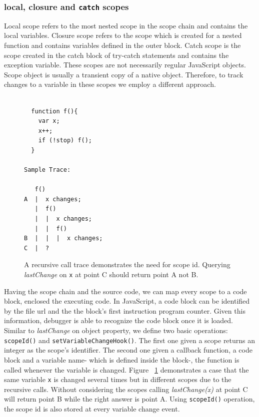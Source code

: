 \documentclass[preprint]{sigplanconf}
\begin{document}
\subsubsection{local, closure and \texttt{catch} scopes}
Local scope refers to the most nested scope in the scope
chain and contains the local variables. Closure scope refers to the 
scope which is created for a nested function and contains variables 
defined in the outer block. Catch scope is the scope created in the catch
block of try-catch statements and contains the exception
variable. These scopes are not necessarily regular JavaScript
objects. Scope object is usually a transient copy of a native object. 
Therefore, to track changes to a variable in these scopes we
employ a different approach.

\begin{figure}[htp]
\begin{verbatim}

  function f(){
    var x;
    x++;
    if (!stop) f();
  }

Sample Trace:

   f()
A  |  x changes; 
   |  f()
   |  |  x changes;
   |  |  f()
B  |  |  |  x changes; 
C  |  ?

\end{verbatim}
\caption{A recursive call trace demonstrates the need for scope
  id. Querying \textit{lastChange} on \texttt{x} at point C should
  return point A not B.}
\label{fig:recursive}
\end{figure}

Having the scope chain and the source code, we can map every scope to %
a code block, enclosed the executing code. In
JavaScript, a code block can be identified by the file url and the 
the block's first instruction program counter. Given this information, debugger is
able to recognize the code block once it is loaded.
Similar to \textit{lastChange} on object property, we define two basic operations: 
\texttt{scopeId()} and \texttt{setVariableChangeHook()}. The first one 
given a scope returns an integer as the scope's identifier. The second one 
given a callback function, a code block and a variable name-
which is defined inside the block-, the function is called
whenever the variable is changed. Figure ~\ref{fig:recursive} demonstrates a case that the same variable
\texttt{x} is changed several times but in different scopes due to the
recursive calls. Without considering the scopes calling \textit{lastChange(x)}
at point C will return point B while the right answer is point A. Using
\texttt{scopeId()} operation, the scope id is also stored at every variable
change event.
\end{document}
